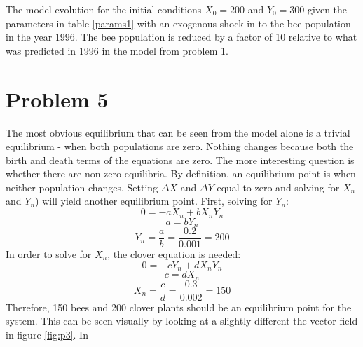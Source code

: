 \documentclass[12pt,a4paper,titlepage]{report}
\begin{document}
		\begin{table} 
			\centering
			
			\caption{The model evolution for the initial conditions \(X_{0} = 200\) and \(Y_{0} = 300\) given the parameters in table \ref{params1} with an exogenous shock in to the bee population in the year 1996. The bee population is reduced by a factor of 10 relative to what was predicted in 1996 in the model from problem 1.}
			\label{tab:p4}
		\end{table}
	
	\section*{Problem 5}
		The most obvious equilibrium that can be seen from the model alone is a trivial equilibrium - when both populations are zero. Nothing changes because both the birth and death terms of the equations are zero. The more interesting question is whether there are non-zero equilibria. By definition, an equilibrium point is when neither population changes. Setting \(\Delta X\) and \(\Delta Y\) equal to zero and solving for \(X_n\) and \(Y_n\)) will yield another equilibrium point. First, solving for \(Y_n\):  
		\[0 = -aX_{n} + b X_{n}Y_{n}\]
		\[a  = b Y_{n}\]
		\[Y_{n} = \frac{a}{b} = \frac{0.2}{0.001} = 200\]
		In order to solve for \(X_n\), the clover equation is needed:
		\[0 = -cY_{n} + d X_{n}Y_{n}\]
		\[c  = d X_{n}\]
		\[X_{n} = \frac{c}{d} = \frac{0.3}{0.002} = 150\]
		Therefore, 150 bees and 200 clover plants should be an equilibrium point for the system. This can be seen visually by looking at a slightly different the vector field in figure \ref{fig:p3}. In 
\end{document}
